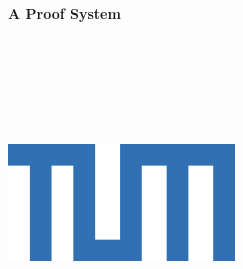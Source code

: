 \begin{titlepage}
    \begin{center}
        \large

        \hfill

        \vfill

        \begingroup
            \\{\Large\textbf{A Proof System}} \\ \bigskip
        \endgroup
        \bigskip

        \scshape{\normalsize\myType} \\

        \vfill

        \spacedlowsmallcaps{\Large\myName} \\

        \scshape{\normalsize\myDepartment} \\
        \scshape{\normalsize\myUni} \\ \medskip


        \vfill

        \includegraphics[width=6cm]{gfx/tum-logo} \\ \medskip




        \vfill

    \end{center}
\end{titlepage}
